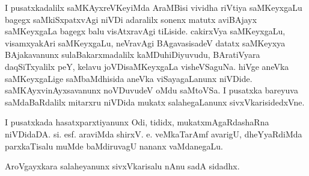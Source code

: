 I pusatxkadalilx saMKAyxreVKeyiMda AraMBisi vividha riVtiya saMKeyxgaLu bagegx saMkiSxpatxvAgi niVDi adaralilx sonenx matutx aviBAjayx saMKeyxgaLa bagegx balu visAtxravAgi tiLiside. cakirxVya saMKeyxgaLu, visamxyakAri saMKeyxgaLu, neVravAgi BAgavasisadeV datatx saMKeyxya BAjakavanunx sulaBakarxmadalilx kaMDuhiDiyuvudu, BAratiVyara daqSiTxyalilx peY, kelavu joVDisaMKeyxgaLa visheVSaguNa. hiVge aneVka saMKeyxgaLige saMbaMdhisida aneVka viSayagaLanunx niVDide. saMKAyxvinAyxsavanunx noVDuvudeV oMdu saMtoVSa. I pusatxka bareyuva saMdaBaRdalilx mitarxru niVDida mukatx salahegaLanunx sivxVkarisidedxVne.

I pusatxkada hasatxparxtiyanunx Odi, tididx, mukatxmAgaRdashaRna niVDida\break DA. si. esf. araviMda shirxV. e. veMkaTarAmf avarigU, dheYyaRdiMda parxkaTisalu muMde baMdiruvagU nananx vaMdanegaLu.

AroVgayxkara salaheyanunx sivxVkarisalu nAnu sadA sidadhx.

